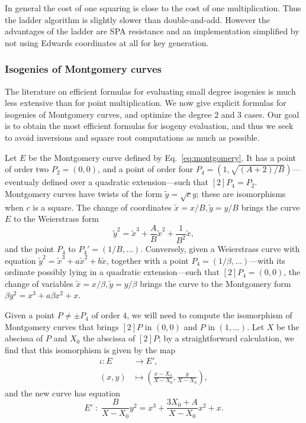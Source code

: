 \documentclass[jmc]{degruyter-journal-a}
\theoremstyle{definition}
\begin{document}
In general the cost of one squaring is close to the cost of one
multiplication. Thus the ladder algorithm is slightly slower than
double-and-add. However the advantages of the ladder are SPA
resistance and an implementation simplified by not using Edwards
coordinates at all for key generation.

\subsubsection{Isogenies of Montgomery curves}\label{sssec:montgomery-isogeny}

The literature on efficient formulas for evaluating small degree
isogenies is much less extensive than for point multiplication. We now
give explicit formulas for isogenies of Montgomery curves, and
optimize the degree $2$ and $3$ cases. Our goal is to obtain the most
efficient formulas for isogeny evaluation, and thus we seek to avoid
inversions and square root computations as much as possible.

Let $E$ be the Montgomery curve defined by Eq.~\eqref{eq:montgomery}.
It has a point of order two $P_2=(0,0)$, and a point of order four
$P_4=(1,\sqrt{(A+2)/B})$---eventualy defined over a quadratic
extension---such that $[2]P_4=P_2$. Montgomery curves have twists of
the form $\tilde{y}=\sqrt{c}y$; these are isomorphisms when $c$ is a
square. The change of coordinates $\tilde{x}=x/B, \tilde{y}=y/B$
brings the curve $E$ to the Weierstrass form
\begin{equation}
  \label{eq:twisted}
  \tilde{y}^2 = \tilde{x}^3 + \frac{A}{B}\tilde{x}^2 + \frac{1}{B^2}\tilde{x},
\end{equation}
and the point $P_4$ to $P_4'=(1/B,\ldots)$. Conversely, given a
Weierstrass curve with equation
$\tilde{y}^2=\tilde{x}^3+a\tilde{x}^2+b\tilde{x}$, together with a
point $P_4=(1/\beta,\ldots)$---with its ordinate possibly lying in a
quadratic extension---such that $[2]P_4=(0,0)$, the change of
variables $\tilde{x}=x/\beta, \tilde{y}=y/\beta$ brings the curve to
the Montgomery form $\beta y^2=x^3+a\beta x^2 + x$.

Given a point $P\ne\pm P_4$ of order $4$, we will need to compute the
isomorphism of Montgomery curves that brings $[2]P$ in $(0,0)$ and $P$
in $(1,\ldots)$. Let $X$ be the abscissa of $P$ and $X_0$ the abscissa
of $[2]P$; by a straightforward calculation, we find that this
isomorphism is given by the map
\begin{equation}
  \label{eq:isomorphism}
  \begin{aligned}
    \iota : E &\to E',\\
    (x,y) &\mapsto \left(\frac{x-X_0}{X-X_0}, \frac{y}{X-X_0}\right),
  \end{aligned}
\end{equation}
and the new curve has equation
\begin{equation*}
  E' \;:\; \frac{B}{X-X_0}y^2 = x^3 + \frac{3X_0 + A}{X-X_0} x^2 + x.
\end{equation*}
\end{document}
